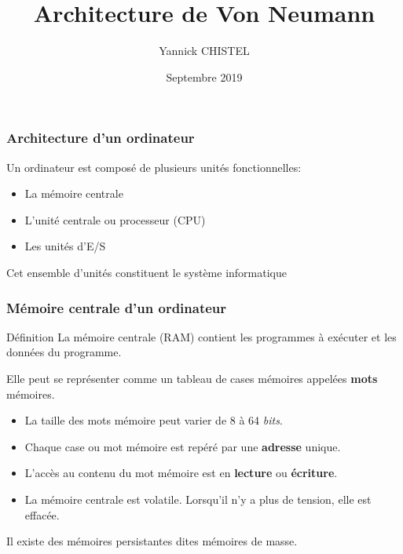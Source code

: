 \documentclass{beamer}
\title{Architecture de Von Neumann}
\author{Yannick CHISTEL}
\institute{Lycée Dumont d'Urville - CAEN}
\date{Septembre 2019}
\begin{document}
 
\frame{\titlepage}
 
\begin{frame}
\frametitle{Architecture d’un ordinateur}
Un ordinateur est composé de plusieurs unités fonctionnelles:
\begin{itemize}
\item La mémoire centrale
\item L’unité centrale ou processeur (CPU)
\item Les unités d’E/S
\end{itemize}
Cet ensemble d’unités constituent le système informatique

\end{frame}
 
\begin{frame}
\frametitle{Mémoire centrale d’un ordinateur}
\begin{block}{Définition}
La mémoire centrale (RAM) contient les programmes à exécuter et les données du programme. 

Elle peut se représenter comme un tableau de cases mémoires appelées \textbf{mots} mémoires.
\end{block}

\begin{itemize}
\item La taille des mots mémoire peut varier de 8 à 64 \textit{bits}.
\item Chaque case ou mot mémoire est repéré par une \textbf{adresse} unique.
\item L'accès au contenu du mot mémoire est en \textbf{lecture} ou \textbf{écriture}.
\item La mémoire centrale est volatile. Lorsqu'il n'y a plus de tension, elle est effacée.
\end{itemize}
Il existe des mémoires persistantes dites mémoires de masse.
\end{frame}
\end{document}
